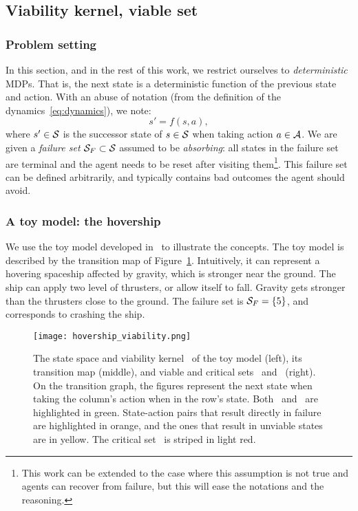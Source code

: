 	\subsection{Viability kernel, viable set}
	\subsubsection{Problem setting}
	In this section, and in the rest of this work, we restrict ourselves to\emph{ deterministic} MDPs. That is, the next state is a deterministic function of the previous state and action. With an abuse of notation (from the definition of the dynamics~\eqref{eq:dynamics}), we note:
	\begin{equation}
		s' = f(s, a),
	\end{equation}
	where $s'\in\S$ is the successor state of $s\in\S$ when taking action $a\in\A$. We are given a\emph{ failure set} $\SF\subset\S$ assumed to be\emph{ absorbing}: all states in the failure set are terminal and the agent needs to be reset after visiting them\footnote{This work can be extended to the case where this assumption is not true and agents can recover from failure, but this will ease the notations and the reasoning.}. This failure set can be defined arbitrarily, and typically contains bad outcomes the agent should avoid.
	\subsubsection{A toy model: the hovership}\label{sec:hovership}
	We use the toy model developed in~\cite{heim2020learnable} to illustrate the concepts. The toy model is described by the transition map of Figure~\ref{fig:hovership}. Intuitively, it  can represent a hovering spaceship affected by gravity, which is stronger near the ground. The ship can apply two level of thrusters, or allow itself to fall. Gravity gets stronger than the thrusters close to the ground. The failure set is $\SF = \{5\}$, and corresponds to crashing the ship.
	\begin{figure}
		\centering
		\texttt{[image: hovership\_viability.png]}
		\caption[Hovership toy model]{The state space and viability kernel \SV~of the toy model (left), its transition map (middle), and viable and critical sets \QV~and \QC~(right). On the transition graph, the figures represent the next state when taking the column's action when in the row's state. Both \QV~and \SV~are highlighted in green. State-action pairs that result directly in failure are highlighted in orange, and the ones that result in unviable states are in yellow. The critical set \QC~is striped in light red. }
		\label{fig:hovership}
	\end{figure}
